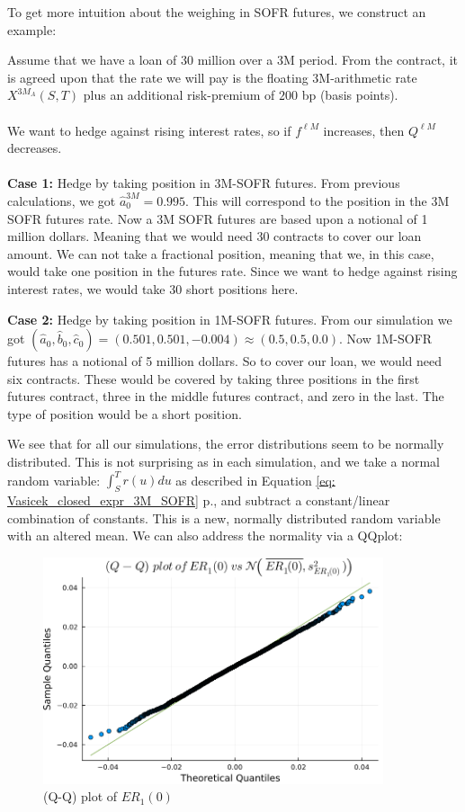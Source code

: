 To get more intuition about the weighing in SOFR futures, we construct an example:

\begin{example}
Assume that we have a loan of 30 million over a 3M period. From the contract, it is agreed upon that the rate we will pay is the floating 3M-arithmetic rate $X^{3M_{A}}(S,T)$ plus an additional risk-premium of $200$ bp (basis points). 
\\~\\
We want to hedge against rising interest rates, so if $f^{\ell M}$ increases, then $Q^{\ell M}$ decreases. 
\\~\\
\textbf{Case 1:} Hedge by taking position in 3M-SOFR futures. From previous calculations, we got $\hat{a}_{0}^{3M} = 0.995$. This will correspond to the position in the 3M SOFR futures rate. Now a 3M SOFR futures are based upon a notional of 1 million dollars. Meaning that we would need 30 contracts to cover our loan amount. We can not take a fractional position, meaning that we, in this case, would take one position in the futures rate. Since we want to hedge against rising interest rates, we would take 30 short positions here. 

\newpage
\textbf{Case 2:} Hedge by taking position in 1M-SOFR futures. From our simulation we got $(\hat{a}_{0}, \hat{b}_{0}, \hat{c}_{0})
= 
(0.501, 0.501, -0.004) \approx (0.5, 0.5, 0.0)
$. Now 1M-SOFR futures has a notional of 5 million dollars. So to cover our loan, we would need six contracts. These would be covered by taking three positions in the first futures contract, three in the middle futures contract, and zero in the last. The type of position would be a short position. 
\end{example}


We see that for all our simulations, the error distributions seem to be normally distributed. This is not surprising as in each simulation, and we take a normal random variable: $\int_{S}^{T}r(u)du$ as described in  Equation \ref{eq: Vasicek_closed_expr_3M_SOFR} p.\pageref{eq: Vasicek_closed_expr_3M_SOFR}, and subtract a constant/linear combination of constants. This is a new, normally distributed random variable with an altered mean. 
We can also address the normality via a QQplot:


\begin{figure}[htp]
    \centering
    \includegraphics[width=10cm]{figures/SOFR/QQ_plot_ER_1(0).PNG}
    \caption{(Q-Q) plot of $ER_{1}(0)$}
    \label{fig: ER_1(0)_QQ_plt}
\end{figure}
